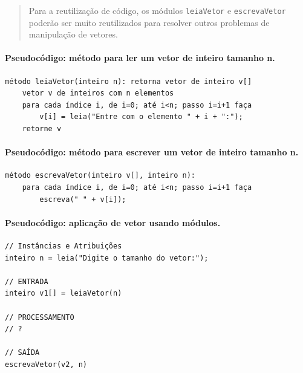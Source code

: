 \documentclass[12pt,a4paper]{article}
\begin{document}
\begin{quote}
Para a reutilização de código, os módulos \texttt{leiaVetor} e
\texttt{escrevaVetor} poderão ser muito reutilizados para resolver
outros problemas de manipulação de vetores.
\end{quote}

    \hypertarget{pseudocuxf3digo-muxe9todo-para-ler-um-vetor-de-inteiro-tamanho-n.}{%
\paragraph{Pseudocódigo: método para ler um vetor de inteiro tamanho
n.}\label{pseudocuxf3digo-muxe9todo-para-ler-um-vetor-de-inteiro-tamanho-n.}}

    \begin{verbatim}
método leiaVetor(inteiro n): retorna vetor de inteiro v[]
    vetor v de inteiros com n elementos
    para cada índice i, de i=0; até i<n; passo i=i+1 faça
        v[i] = leia("Entre com o elemento " + i + ":");
    retorne v
\end{verbatim}

    \hypertarget{pseudocuxf3digo-muxe9todo-para-escrever-um-vetor-de-inteiro-tamanho-n.}{%
\paragraph{Pseudocódigo: método para escrever um vetor de inteiro
tamanho
n.}\label{pseudocuxf3digo-muxe9todo-para-escrever-um-vetor-de-inteiro-tamanho-n.}}

    \begin{verbatim}
método escrevaVetor(inteiro v[], inteiro n):
    para cada índice i, de i=0; até i<n; passo i=i+1 faça
        escreva(" " + v[i]);
\end{verbatim}

    \hypertarget{pseudocuxf3digo-aplicauxe7uxe3o-de-vetor-usando-muxf3dulos.}{%
\paragraph{Pseudocódigo: aplicação de vetor usando
módulos.}\label{pseudocuxf3digo-aplicauxe7uxe3o-de-vetor-usando-muxf3dulos.}}

    \begin{verbatim}
// Instâncias e Atribuições
inteiro n = leia("Digite o tamanho do vetor:");

// ENTRADA
inteiro v1[] = leiaVetor(n)

// PROCESSAMENTO
// ?

// SAÍDA
escrevaVetor(v2, n)
\end{verbatim}
\end{document}
